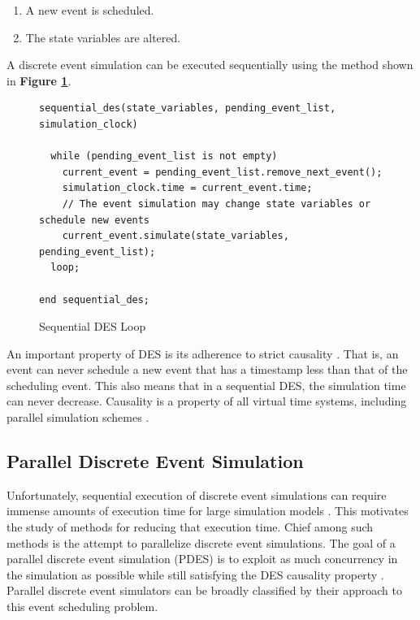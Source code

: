 \documentclass[11pt]{book}
\begin{document}
\begin{enumerate}
  \item A new event is scheduled.
  \item The state variables are altered.
\end{enumerate}

A discrete event simulation can be executed sequentially using the method shown
in \textbf{Figure \ref{sequential-des}}.

\begin{figure}[h]
\centering
\begin{verbatim}
sequential_des(state_variables, pending_event_list, simulation_clock)

  while (pending_event_list is not empty)
    current_event = pending_event_list.remove_next_event();
    simulation_clock.time = current_event.time;
    // The event simulation may change state variables or schedule new events
    current_event.simulate(state_variables, pending_event_list);
  loop;

end sequential_des;
\end{verbatim}
\caption{Sequential DES Loop \cite{jacob-13}}
\label{sequential-des}
\end{figure}

An important property of DES is its adherence to strict causality
\cite{fujimoto-pdes}. That is, an event can never schedule a new event that has
a timestamp less than that of the scheduling event. This also means that in a
sequential DES, the simulation time can never decrease. Causality is a property
of all virtual time systems, including parallel simulation schemes
\cite{lamport-78}.

\subsection{\textbf{Parallel Discrete Event Simulation}}

Unfortunately, sequential execution of discrete event simulations can require
immense amounts of execution time for large simulation models
\cite{fujimoto-pdes}. This motivates the study of methods for reducing that
execution time. Chief among such methods is the attempt to parallelize discrete
event simulations. The goal of a parallel discrete event simulation (PDES) is to
exploit as much concurrency in the simulation as possible while still satisfying
the DES causality property \cite{fujimoto-89b}. Parallel discrete event
simulators can be broadly classified by their approach to this event scheduling
problem.
\end{document}
